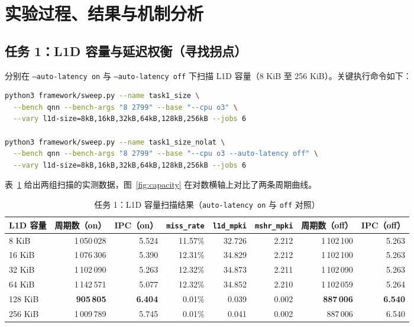 \documentclass[12pt,a4paper,fontset=mac]{ctexart}
\begin{document}
\section{实验过程、结果与机制分析}

\subsection{任务 1：L1D 容量与延迟权衡（寻找拐点）}
分别在 \texttt{--auto-latency on} 与 \texttt{--auto-latency off} 下扫描 L1D 容量（8 KiB 至 256 KiB）。关键执行命令如下：
\begin{lstlisting}[language=bash,caption={任务 1 容量扫描命令}]
python3 framework/sweep.py --name task1_size \
  --bench qnn --bench-args "8 2799" --base "--cpu o3" \
  --vary l1d-size=8kB,16kB,32kB,64kB,128kB,256kB --jobs 6

python3 framework/sweep.py --name task1_size_nolat \
  --bench qnn --bench-args "8 2799" --base "--cpu o3 --auto-latency off" \
  --vary l1d-size=8kB,16kB,32kB,64kB,128kB,256kB --jobs 6
\end{lstlisting}

表~\ref{tab:task1} 给出两组扫描的实测数据，图~\ref{fig:capacity} 在对数横轴上对比了两条周期曲线。

\begin{table}[H]\centering\footnotesize\setlength{\tabcolsep}{4.5pt}
\caption{任务 1：L1D 容量扫描结果（\texttt{auto-latency on} 与 \texttt{off} 对照）}\label{tab:task1}
\begin{tabular}{lrrrrrrr}\toprule
L1D 容量 & 周期数（on） & IPC（on） & \texttt{miss\_rate} & \texttt{l1d\_mpki} & \texttt{mshr\_mpki} & 周期数（off） & IPC（off） \\\midrule
8 KiB   & 1\,050\,028 & 5.524 & 11.57\% & 32.726 & 2.212 & 1\,102\,100 & 5.263 \\
16 KiB  & 1\,076\,306 & 5.390 & 12.31\% & 34.829 & 2.212 & 1\,102\,100 & 5.263 \\
32 KiB  & 1\,102\,090 & 5.263 & 12.32\% & 34.873 & 2.211 & 1\,102\,090 & 5.263 \\
64 KiB  & 1\,142\,571 & 5.077 & 12.32\% & 34.852 & 2.210 & 1\,102\,059 & 5.264 \\
128 KiB & \textbf{905\,805} & \textbf{6.404} & 0.01\%  & 0.039  & 0.002 & \textbf{887\,006} & \textbf{6.540} \\
256 KiB & 1\,009\,789 & 5.745 & 0.01\%  & 0.041  & 0.002 & 887\,006    & 6.540 \\
\bottomrule\end{tabular}
\end{table}
\end{document}
